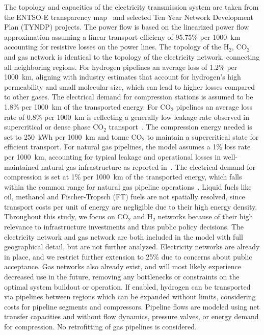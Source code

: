 \documentclass[twocolumn]{article}
\newcommand{\carbon}{CO$_2$}
\newcommand{\hydrogen}{H$_2$}
\begin{document}
The topology and capacities of the electricity transmission system are taken from the ENTSO-E transparency map~\cite{wiegmansGridkitExtractEntsoE2016} and selected Ten Year Network Development Plan (TYNDP) projects. The power flow is based on the linearized power flow approximation assuming a linear transport efficieny of 95.75\% per 1000~km accounting for resistive losses on the power lines. %
The topology of the \hydrogen{}, \carbon{} and gas network is identical to the topology of the electricity network, connecting all neighboring regions.
For hydrogen pipelines an average loss of 1.2\% per 1000~km, aligning with industry estimates that account for hydrogen's high permeability and small molecular size, which can lead to higher losses compared to other gases. The electrical demand for compression stations is assumed to be 1.8\% per 1000~km of the transported energy.
For \carbon{} pipelines an average loss rate of 0.8\% per 1000~km is reflecting a generally low leakage rate observed in supercritical or dense phase \carbon{} transport~\cite{liuExperimentalStudyLeakage2023,vitaliRisksSafetyCO22021}. The compression energy needed is set to 250~kWh per 1000~km and tonne \carbon{} to maintain a supercritical state for efficient transport. For natural gas pipelines, the model assumes a 1\% loss rate per 1000~km, accounting for typical leakage and operational losses in well-maintained natural gas infrastructure as reported in~\cite{NaturalGasTransmission2021}. The electrical demand for compression is set at 1\% per 1000~km of the transported energy, which falls within the common range for natural gas pipeline operations~\cite{mcvayreneeMethaneEmissionsGas2023}.
%
Liquid fuels like oil, methanol and Fischer-Tropsch (FT) fuels are not spatially resolved, since transport costs per unit of energy are negligible due to their high energy density. Throughout this study, we focus on \carbon{} and \hydrogen{} networks because of their high relevance to infrastructure investments and thus public policy decisions. The electricity network and gas network are both included in the model with full geographical detail, but are not further analyzed. Electricity networks are already in place, and we restrict further extension to 25\% due to concerns about public acceptance. Gas networks also already exist, and will most likely experience decreased use in the future, removing any bottlenecks or constraints on the optimal system buildout or operation.
If enabled, hydrogen can be transported via pipelines between regions which can be expanded without limits, considering costs for pipeline segments and compressors. Pipeline flows are modeled using net transfer capacities and without flow dynamics, pressure valves, or energy demand for compression. No retrofitting of gas pipelines is considered.
\end{document}
